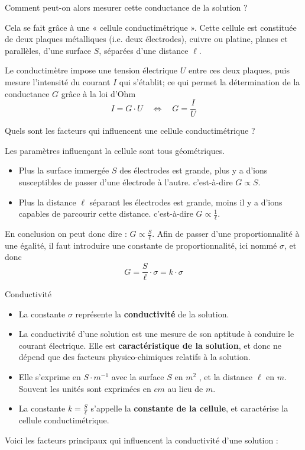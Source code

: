 \documentclass[11pt,a4paper]{article}
\begin{document}
Comment peut-on alors mesurer cette conductance de la solution ?

Cela se fait grâce à une « cellule conductimétrique ».  Cette cellule est constituée de deux plaques métalliques (i.e. deux électrodes), cuivre ou platine, planes et parallèles, d’une surface $S$, séparées d’une distance $\ell$. 

Le conductimètre impose une tension électrique $U$ entre ces deux plaques, puis mesure l'intensité du courant $I$ qui s'établit; ce qui permet la détermination de la conductance $G$ grâce à la loi d'Ohm 
$$I= G\cdot U \quad \Leftrightarrow \quad G=\frac{I}{U}$$  

Quels sont les facteurs qui influencent une cellule conductimétrique ?

\endgroup

Les paramètres influençant la cellule sont tous géométriques.
\begin{itemize}
    \item Plus la surface immergée $S$ des électrodes est grande, plus y a d’ions susceptibles de passer d’une électrode à l’autre. c'est-à-dire $G \propto S $.
    \item Plus la distance $\ell$ séparant les électrodes est grande, moins il y a d’ions capables de parcourir cette distance. c'est-à-dire $G \propto \frac{1}{\ell} $.
\end{itemize}
	 
En conclusion on peut donc dire : $G \propto \frac{S}{\ell}$. Afin de passer d'une proportionnalité à une égalité, il faut introduire une constante de proportionnalité, ici nommé $\sigma$, et donc 
\[ G = \dfrac{S}{\ell}\cdot \sigma = k\cdot \sigma      \]

\begin{defn}{Conductivité}
\begin{itemize}
    \item La constante $\sigma$ représente la \textbf{conductivité}  de la solution.   
    \item La conductivité d’une solution est une mesure de son aptitude à conduire le courant électrique.  Elle est \textbf{caractéristique de la solution}, et donc ne dépend que des facteurs physico-chimiques relatifs à la solution. 
    \item Elle s’exprime en $S\cdot m^{-1}$ avec la surface $S$ en $m^2$ , et la distance $\ell$ en $m$.  Souvent les unités sont exprimées en $cm$ au lieu de $m$.
    \item La constante $k=\frac{S}{\ell}$ s’appelle la \textbf{constante de la cellule}, et caractérise la cellule conductimétrique. 
\end{itemize}
\end{defn}
\vspace{1cm}
Voici les facteurs principaux qui influencent la conductivité d'une solution : 
\end{document}

